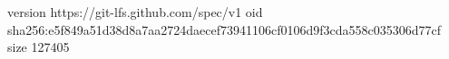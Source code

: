 version https://git-lfs.github.com/spec/v1
oid sha256:e5f849a51d38d8a7aa2724daecef73941106cf0106d9f3cda558c035306d77cf
size 127405
